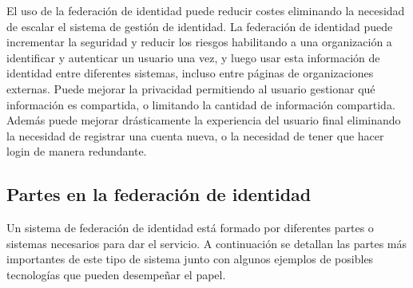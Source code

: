     El uso de la federación de identidad puede reducir costes
    eliminando la necesidad de escalar el sistema de gestión de
    identidad. La federación de identidad puede incrementar la
    seguridad y reducir los riesgos habilitando a una organización a
    identificar y autenticar un usuario una vez, y luego usar esta
    información de identidad entre diferentes sistemas, incluso entre
    páginas de organizaciones externas. Puede mejorar la privacidad
    permitiendo al usuario gestionar qué información es compartida, o
    limitando la cantidad de información compartida. Además puede
    mejorar drásticamente la experiencia del usuario final eliminando
    la necesidad de registrar una cuenta nueva, o la necesidad de
    tener que hacer login de manera redundante.

        \subsection{Partes en la federación de identidad}

    Un sistema de federación de identidad está formado por diferentes
    partes o sistemas necesarios para dar el servicio. A continuación
    se detallan las partes más importantes de este tipo de sistema
    junto con algunos ejemplos de posibles tecnologías que pueden
    desempeñar el papel.

